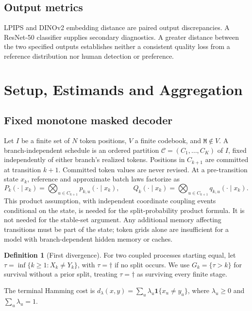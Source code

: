 \documentclass[11pt,a4paper]{article}
\theoremstyle{plain}
\theoremstyle{definition}
\newtheorem{definition}[theorem]{Definition}
\theoremstyle{remark}
\newcommand{\Ind}[1]{\mathbf{1}\{#1\}}
\newcommand{\Mask}{\texttt{M}}
\begin{document}
\subsection{Output metrics}
LPIPS \citep{zhang2018unreasonable} and DINOv2 embedding distance
\citep{oquab2024dinov2} are paired output discrepancies. A ResNet-50 classifier
\citep{he2016deep} supplies secondary diagnostics. A greater distance between
the two specified outputs establishes neither a consistent quality loss from a
reference distribution nor human detection or preference.

\section{Setup, Estimands and Aggregation}
\label{sec:setup}
\subsection{Fixed monotone masked decoder}
Let $I$ be a finite set of $N$ token positions, $V$ a finite codebook, and
$\Mask\notin V$. A branch-independent schedule is an ordered partition
$\mathcal C=(C_1,\ldots,C_K)$ of $I$, fixed independently of either branch's
realized tokens. Positions in $C_{k+1}$ are committed at transition $k+1$.
Committed token values are never revised. At a pre-transition state $x_k$,
reference and approximate batch laws factorize as
\[
 P_k(\cdot\mid x_k)=\bigotimes_{u\in C_{k+1}}p_{k,u}(\cdot\mid x_k),\qquad
 Q_k(\cdot\mid x_k)=\bigotimes_{u\in C_{k+1}}q_{k,u}(\cdot\mid x_k).
\]
This product assumption, with independent coordinate coupling events conditional
on the state, is needed for the split-probability product formula. It is not
needed for the stable-set argument. Any additional memory affecting transitions
must be part of the state; token grids alone are insufficient for a model with
branch-dependent hidden memory or caches.

\begin{definition}[First divergence]
For two coupled processes starting equal, let
$\tau=\inf\{k\geq1:X_k\neq Y_k\}$, with $\tau=\dagger$ if no split occurs.
We use $G_k=\{\tau>k\}$ for survival without a prior split, treating
$\tau=\dagger$ as surviving every finite stage.
\end{definition}
The terminal Hamming cost is
$d_\lambda(x,y)=\sum_u\lambda_u\Ind{x_u\neq y_u}$, where
$\lambda_u\geq0$ and $\sum_u\lambda_u=1$.
\end{document}
